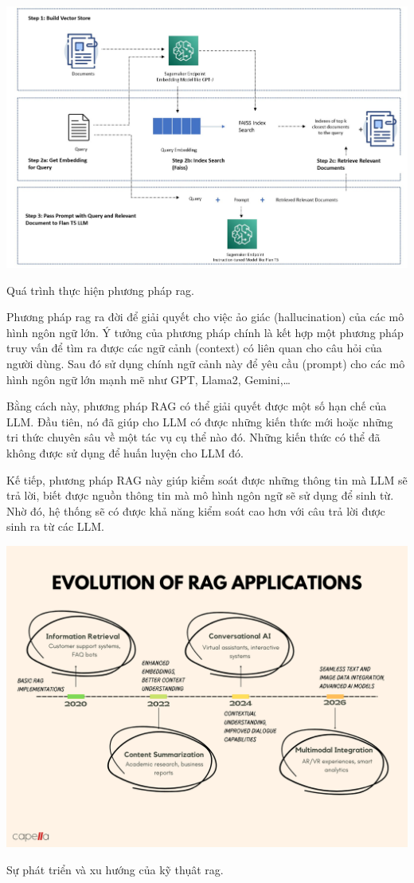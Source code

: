 \documentclass[a4paper, 12pt, openany]{book}
\begin{document}
\begin{minipage}{\linewidth}
    \centering
    \includegraphics[width=14cm]{./assets/images/RAG-procedure.jpg}
    \captionsetup{type=figure}
    \caption{Quá trình thực hiện phương pháp \ac{rag}.}
\end{minipage}

\vspace{0.2cm}

Phương pháp \ac{rag} ra đời để giải quyết cho việc ảo giác (hallucination) của các
mô hình ngôn ngữ lớn. Ý tưởng của phương pháp chính là kết hợp một phương pháp truy vấn
để tìm ra được các ngữ cảnh (context) có liên quan cho câu hỏi của người dùng. Sau đó sử dụng chính 
ngữ cảnh này để yêu cầu (prompt) cho các mô hình ngôn ngữ lớn mạnh mẽ như GPT, Llama2, Gemini,\dots

Bằng cách này, phương pháp RAG có thể giải quyết được một số hạn chế của LLM. Đầu tiên, nó đã giúp cho
LLM có được những kiến thức mới hoặc những tri thức chuyên sâu về một tác vụ cụ thể nào đó. Những kiến thức có thể đã không được
sử dụng để huấn luyện cho LLM đó.

Kế tiếp, phương pháp RAG này giúp kiểm soát được những thông tin mà LLM sẽ trả lời, biết được nguồn thông tin mà mô
hình ngôn ngữ sẽ sử dụng để sinh từ. Nhờ đó, hệ thống sẽ có được khả năng kiểm soát cao hơn với câu trả lời được sinh ra
từ các LLM.

\begin{minipage}{\linewidth}
    \centering
    \includegraphics[width=.8\linewidth]{./assets/images/RAG-evolution.png}
    \captionsetup{type=figure}
    \caption{Sự phát triển và xu hướng của kỹ thụât \ac{rag}.}
\end{minipage}
\end{document}
